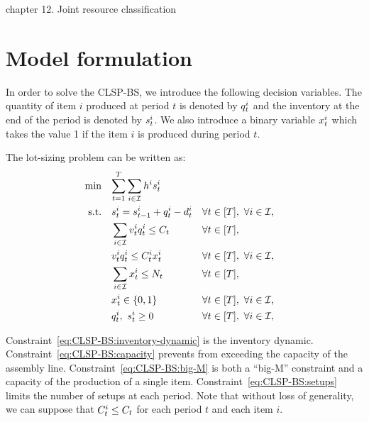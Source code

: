 
\cite{Pochet2006} chapter 12. Joint resource classification



\section{Model formulation}


In order to solve the CLSP-BS, we introduce the following decision variables. The quantity of item $i$ produced at period $t$ is denoted by $q_t^i$ and the inventory at the end of the period is denoted by $s_t^i$. We also introduce a binary variable $x_t^i$ which takes the value 1 if the item $i$ is produced during period $t$.

The lot-sizing problem can be written as:
\begin{subequations}\label{eq:CLSP-BS}
  \begin{align}
    \min\quad & \rlap{$\ds \sum_{t=1}^{\horizon} \sum_{i\in\REF} \holding^i \inventory_t^i$}
    \label{eq:CLSP-BS:objective}
    \\
    \st\quad & \ds \inventory_t^i = \inventory_{t-1}^i + \quantity_t^i - \demand_t^i && \forall t\in\range{\horizon},\ \forall i\in\REF,
    \label{eq:CLSP-BS:inventory-dynamic}
    \\
    & \ds \sum_{i\in\REF} \rate_t^i \quantity_t^i \le \capacity_t && \forall t\in\range{\horizon},
    \label{eq:CLSP-BS:capacity}
    \\
    & \ds \rate_t^i \quantity_t^i \le \capacity_t^i \setup_t^i && \forall t\in\range{\horizon},\ \forall i\in\REF,
    \label{eq:CLSP-BS:big-M}
    \\
    & \ds \sum_{i\in\REF} \setup_t^i \le \nbsetups_t && \forall t\in\range{\horizon},
    \label{eq:CLSP-BS:setups}
    \\
    & \ds \setup_t^i \in \crbracket{0,1} && \forall t\in\range{\horizon},\ \forall i\in\REF,
    \label{eq:CLSP-BS:boolean}
    \\
    & \ds \quantity_t^i,\ \inventory_t^i \ge 0 && \forall t\in\range{\horizon},\ \forall i\in\REF,
    \label{eq:CLSP-BS:positivity}
  \end{align}
\end{subequations}

Constraint~\eqref{eq:CLSP-BS:inventory-dynamic} is the inventory dynamic.
Constraint~\eqref{eq:CLSP-BS:capacity} prevents from exceeding the capacity of the assembly line.
Constraint~\eqref{eq:CLSP-BS:big-M} is both a ``big-M'' constraint and a capacity of the production of a single item.
Constraint~\eqref{eq:CLSP-BS:setups} limits the number of setups at each period.
Note that without loss of generality, we can suppose that $C_t^i \le C_t$ for each period $t$ and each item $i$.


